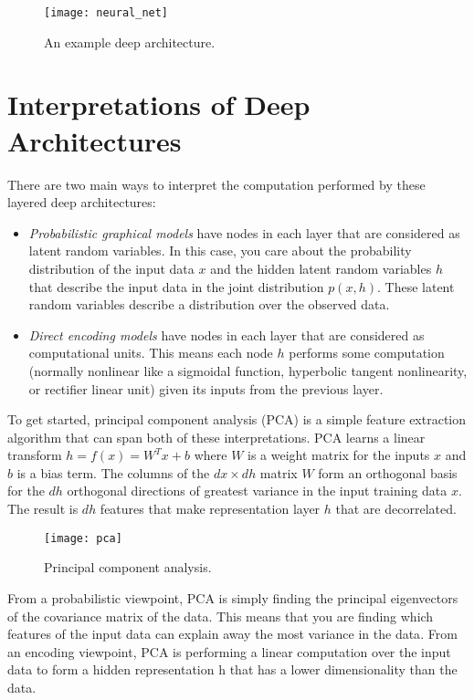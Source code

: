 \begin{figure}[h!]
  \centering
    \texttt{[image: neural\_net]}
\caption{An example deep architecture.}
\end{figure}

\section{Interpretations of Deep Architectures}
There are two main ways to interpret the computation performed by these layered deep architectures:

\begin{itemize}
\item \emph{Probabilistic graphical models} have nodes in each layer that are considered as latent random variables. In this case, you care about the probability distribution of the input data \(x\) and the hidden latent random variables \(h\) that describe the input data in the joint distribution \(p(x,h)\). These latent random variables describe a distribution over the observed data.
\item \emph{Direct encoding models} have nodes in each layer that are considered as computational units. This means each node \(h\) performs some computation (normally nonlinear like a sigmoidal function, hyperbolic tangent nonlinearity, or rectifier linear unit) given its inputs from the previous layer.
\end{itemize}

To get started, principal component analysis (PCA) is a simple feature extraction algorithm that can span both of these interpretations. PCA learns a linear transform \(h = f(x) = W^T x + b\) where \(W\) is a weight matrix for the inputs \(x\) and \(b\) is a bias term. The columns of the \(dx \times dh\) matrix \(W\) form an orthogonal basis for the \(dh\) orthogonal directions of greatest variance in the input training data \(x\). The result is \(dh\) features that make representation layer \(h\) that are decorrelated. 

\begin{figure}[h!]
  \centering
    \texttt{[image: pca]}
\caption{Principal component analysis.}
\end{figure}

From a probabilistic viewpoint, PCA is simply finding the principal eigenvectors of the covariance matrix of the data. This means that you are finding which features of the input data can explain away the most variance in the data\cite{bach05}. From an encoding viewpoint, PCA is performing a linear computation over the input data to form a hidden representation h that has a lower dimensionality than the data.

